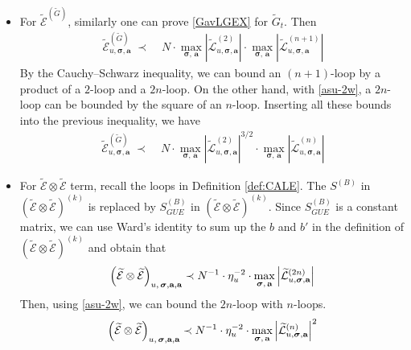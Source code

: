 \documentclass[10pt,reqno]{article}
\theoremstyle{plain} %
\theoremstyle{remark}
\numberwithin{equation}{section}
\begin{document}
\begin{itemize}
 \item For $\mathcal{\widetilde{E}}^{ (\widetilde{G})}$, similarly one can prove \eqref{GavLGEX} for $\widetilde{G}_t$. Then
 \begin{align}\label{WLK4}
       \mathcal{\widetilde{E}}^{ (\widetilde{G})}_{u, \boldsymbol{\sigma}, \textbf{a}}
       \;\prec\; & N\cdot  \max_{\boldsymbol{\sigma}, \,\textbf{a}}   \left| \mathcal{\widetilde{L}} ^{(2)}_{u, \boldsymbol{\sigma}, \textbf{a}}\right|\cdot \max_{\boldsymbol{\sigma}, \,\textbf{a}}  \left|\mathcal{\widetilde{L}} ^{(n+1)} _{u, \boldsymbol{\sigma}, \textbf{a}}\right|
        \end{align}   
 By the Cauchy--Schwarz inequality, we can bound an $(n+1)$-loop by a product of 
a $2$-loop and a $2n$-loop. On the other hand, with \eqref{asu-2w}, a $2n$-loop can be bounded by the square of an $n$-loop. Inserting all these bounds into the previous inequality, we have    
        \begin{align}\label{WLK5} 
        \mathcal{\widetilde{E}}^{ (\widetilde{G})}_{u, \boldsymbol{\sigma}, \textbf{a}}
       \;\prec\; &N\cdot  \max_{\boldsymbol{\sigma}, \,\textbf{a}}   \left| \mathcal{\widetilde{L}} ^{(2)}_{u, \boldsymbol{\sigma}, \textbf{a}}\right|^{3/2}\cdot \max_{\boldsymbol{\sigma}, \,\textbf{a}}   \left|\mathcal{\widetilde{L}} ^{(n )} _{u, \boldsymbol{\sigma}, \textbf{a}}\right|
      \end{align}
      \item For $\mathcal{\widetilde{E}} \otimes  \mathcal{\widetilde{E}}$ term, recall the loops in Definition \ref{def:CALE}. The $S^{(B)}$ in $(\mathcal{\widetilde{E}} \otimes  \mathcal{\widetilde{E}})^{(k)}$ is replaced by $S^{(B)}_{GUE}$ in  $(\mathcal{\widetilde{E}} \otimes  \mathcal{\widetilde{E}})^{(k)}$. Since $S_{GUE}^{(B)}$ is a constant matrix, we can use Ward's identity to sum up the $b$ and $b'$ in the definition of $(\mathcal{\widetilde{E}} \otimes  \mathcal{\widetilde{E}})^{(k)}$ and obtain that  
     \begin{equation}\label{WLK6}
      \left(\mathcal{\widetilde{E}} \otimes  \mathcal{\widetilde{E}} \right)
   _{u, \,\boldsymbol{\sigma},{\textbf a}, {\textbf a}}
   \prec N^{-1}\cdot \eta_u^{-2} \cdot \max_{\boldsymbol{\sigma}, \,\textbf{a}}   \left|\mathcal{\widetilde{L}} ^{(2n )} _{u, \boldsymbol{\sigma}, \textbf{a}}\right|
 \end{equation}
   Then, using \eqref{asu-2w}, we can bound the $2n$-loop with $n$-loops.
   \begin{equation}\label{WLK7}
    \left(\mathcal{\widetilde{E}} \otimes  \mathcal{\widetilde{E}} \right)
   _{u, \,\boldsymbol{\sigma},{\textbf a}, {\textbf a}}\prec  N^{-1}\cdot \eta_u^{-2} \cdot \max_{\boldsymbol{\sigma}, \,\textbf{a}}   \left|\mathcal{\widetilde{L}} ^{( n )} _{u, \boldsymbol{\sigma}, \textbf{a}}\right|^2
\end{equation}
   \end{itemize}
\end{document}
